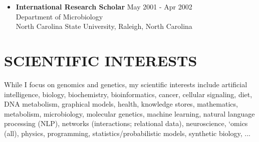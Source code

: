 \documentclass[margin]{res} %
\begin{document}
\begin{resume}
\begin{itemize}
\item \textbf{International Research Scholar} \hfill May 2001 - Apr 2002\vspace{0.05 cm}\\
Department of Microbiology\\
North Carolina State University, Raleigh, North Carolina\vspace{0.1 cm}
\end{itemize}


{\color{blue}\section{SCIENTIFIC INTERESTS}}

While I focus on genomics and genetics, my scientific interests include artificial intelligence, biology, biochemistry, bioinformatics, cancer, cellular signaling, diet, DNA metabolism, graphical models, health, knowledge stores, mathematics, metabolism, microbiology, molecular genetics, machine learning, natural language processing (NLP), networks (interactions; relational data), neuroscience, `omics (all), physics, programming, statistics/probabilistic models, synthetic biology, ...


\end{resume}
\end{document}
